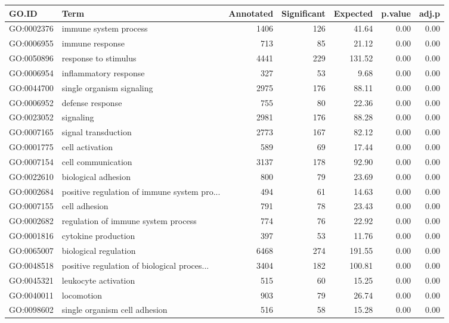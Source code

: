 \begin{table}[ht]
\centering
\begin{tabular}{llrrrrr}
  \hline
GO.ID & Term & Annotated & Significant & Expected & p.value & adj.p \\ 
  \hline
GO:0002376 & immune system process & 1406 & 126 & 41.64 & 0.00 & 0.00 \\ 
  GO:0006955 & immune response & 713 &  85 & 21.12 & 0.00 & 0.00 \\ 
  GO:0050896 & response to stimulus & 4441 & 229 & 131.52 & 0.00 & 0.00 \\ 
  GO:0006954 & inflammatory response & 327 &  53 & 9.68 & 0.00 & 0.00 \\ 
  GO:0044700 & single organism signaling & 2975 & 176 & 88.11 & 0.00 & 0.00 \\ 
  GO:0006952 & defense response & 755 &  80 & 22.36 & 0.00 & 0.00 \\ 
  GO:0023052 & signaling & 2981 & 176 & 88.28 & 0.00 & 0.00 \\ 
  GO:0007165 & signal transduction & 2773 & 167 & 82.12 & 0.00 & 0.00 \\ 
  GO:0001775 & cell activation & 589 &  69 & 17.44 & 0.00 & 0.00 \\ 
  GO:0007154 & cell communication & 3137 & 178 & 92.90 & 0.00 & 0.00 \\ 
  GO:0022610 & biological adhesion & 800 &  79 & 23.69 & 0.00 & 0.00 \\ 
  GO:0002684 & positive regulation of immune system pro... & 494 &  61 & 14.63 & 0.00 & 0.00 \\ 
  GO:0007155 & cell adhesion & 791 &  78 & 23.43 & 0.00 & 0.00 \\ 
  GO:0002682 & regulation of immune system process & 774 &  76 & 22.92 & 0.00 & 0.00 \\ 
  GO:0001816 & cytokine production & 397 &  53 & 11.76 & 0.00 & 0.00 \\ 
  GO:0065007 & biological regulation & 6468 & 274 & 191.55 & 0.00 & 0.00 \\ 
  GO:0048518 & positive regulation of biological proces... & 3404 & 182 & 100.81 & 0.00 & 0.00 \\ 
  GO:0045321 & leukocyte activation & 515 &  60 & 15.25 & 0.00 & 0.00 \\ 
  GO:0040011 & locomotion & 903 &  79 & 26.74 & 0.00 & 0.00 \\ 
  GO:0098602 & single organism cell adhesion & 516 &  58 & 15.28 & 0.00 & 0.00 \\ 

\end{tabular}
\end{table}
